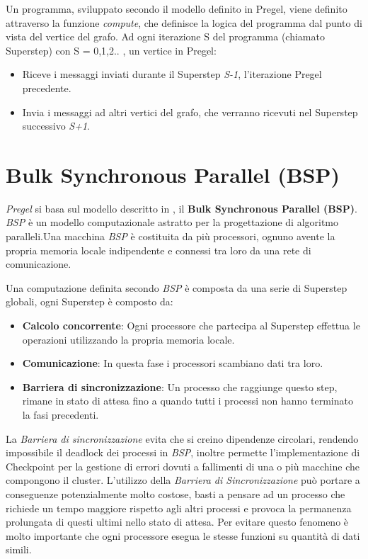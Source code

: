 \documentclass[LaM,binding=0.6cm]{sapthesis}
\begin{document}
Un programma, sviluppato secondo il modello definito in Pregel, viene definito attraverso la funzione \textit{compute}, che definisce la logica del programma dal punto di vista del vertice del grafo. Ad ogni iterazione S del programma (chiamato Superstep) con S = 0,1,2.. , un vertice in Pregel:
\begin{itemize}
\item Riceve i messaggi inviati durante il Superstep \textit{S-1}, l'iterazione Pregel precedente.
\item Invia i messaggi ad altri vertici del grafo, che verranno ricevuti nel Superstep successivo \textit{S+1}.
\end{itemize}

\section{Bulk Synchronous Parallel (BSP)}
\textit{Pregel} si basa sul modello descritto in \cite{Valiant:1990:BMP:79173.79181}, il\textbf{ Bulk Synchronous Parallel (BSP)}.
\textit{BSP }è un modello computazionale astratto per la progettazione di algoritmo paralleli.Una macchina \textit{BSP} è costituita da più processori, ognuno avente la propria memoria locale indipendente e connessi tra loro da una rete di comunicazione.

Una computazione definita secondo \textit{BSP} è composta da una serie di Superstep globali, ogni Superstep è composto da:
\begin{itemize}
\item \textbf{Calcolo concorrente}: Ogni processore che partecipa al Superstep effettua le operazioni utilizzando la propria memoria locale.
\item \textbf{Comunicazione}: In questa fase i processori scambiano dati tra loro.
\item \textbf{Barriera di sincronizzazione}: Un processo che raggiunge questo step, rimane in stato di attesa fino a quando tutti i processi non hanno terminato la fasi precedenti.
\end{itemize}

La \textit{Barriera di sincronizzazione} evita che si creino dipendenze circolari, rendendo impossibile il deadlock dei processi in \textit{BSP}, inoltre permette l'implementazione di Checkpoint per la gestione di errori dovuti a fallimenti di una o più macchine che compongono il cluster. L'utilizzo della \textit{Barriera di Sincronizzazione} può portare a conseguenze potenzialmente molto costose, basti a pensare ad un processo che richiede un tempo maggiore rispetto agli altri processi e provoca la permanenza prolungata di questi ultimi nello stato di attesa. Per evitare questo fenomeno è molto importante che ogni processore esegua le stesse funzioni su quantità di dati simili.
\end{document}

